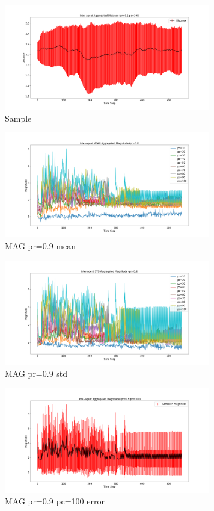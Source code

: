 \documentclass[12pt,a4paper]{IEEEtran}
\begin{document}
\begin{figure}[H]
	\begin{center}
		\includegraphics[width=9cm]{figures/Figure_10}
	\end{center}
	\caption{Sample}
\end{figure}

\begin{figure}[H]
	\begin{center}
		\includegraphics[width=9cm]{figures/mag-pr-0.9-mean}
	\end{center}
	\caption{MAG pr=0.9 mean}
\end{figure}

\begin{figure}[H]
	\begin{center}
		\includegraphics[width=9cm]{figures/mag-pr-0.9-std}
	\end{center}
	\caption{MAG pr=0.9 std}
\end{figure}

\begin{figure}[H]
	\begin{center}
		\includegraphics[width=9cm]{figures/mag-pr-0.9-pc-100-error}
	\end{center}
	\caption{MAG pr=0.9 pc=100 error}
\end{figure}
\end{document}
